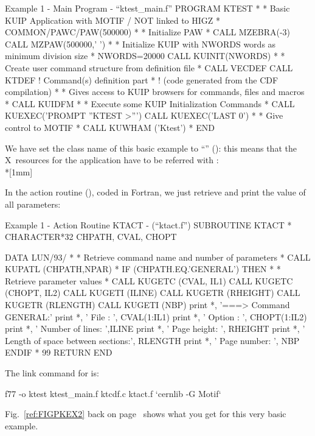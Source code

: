 \begin{XMPt} {Example 1 - Main Program - ``ktest\_main.f''}
      PROGRAM KTEST
*
* Basic KUIP Application with MOTIF / NOT linked to HIGZ
*
      COMMON/PAWC/PAW(500000)
*
* Initialize PAW
*
      CALL MZEBRA(-3)
      CALL MZPAW(500000,' ')
*
* Initialize KUIP with NWORDS words as minimum division size
*
      NWORDS=20000
      CALL KUINIT(NWORDS)
*
* Create user command structure from definition file
*
      CALL VECDEF
      CALL KTDEF          ! Command(s) definition part
*                         ! (code generated from the CDF compilation)
*
* Gives access to KUIP browsers for commands, files and macros
*
      CALL KUIDFM
*
* Execute some KUIP Initialization Commands
*
      CALL KUEXEC('PROMPT ''KTEST >''')
      CALL KUEXEC('LAST 0')
*
* Give control to MOTIF
*
      CALL KUWHAM ('Ktest')
*  
      END
\end{XMPt}

We have set the class name of this basic example to ``'' 
(): this means that the X~resources for the application 
have to be referred with :
\\*[1mm]\mbox{}

In the action routine (), coded in Fortran,  we just retrieve and
print the value of all parameters:

\begin{XMPt} {Example 1 - Action Routine KTACT - (``ktact.f'')}
      SUBROUTINE KTACT
*
      CHARACTER*32 CHPATH, CVAL, CHOPT

      DATA LUN/93/
*
* Retrieve command name and number of parameters
*
      CALL KUPATL (CHPATH,NPAR)
*
      IF (CHPATH.EQ.'GENERAL') THEN
*
* Retrieve parameter values
*
           CALL KUGETC (CVAL, IL1)
           CALL KUGETC (CHOPT, IL2)
           CALL KUGETI (ILINE)
           CALL KUGETR (RHEIGHT)
           CALL KUGETR (RLENGTH)
           CALL KUGETI (NBP)
           print *, '===> Command GENERAL:'
           print *, '     File : ', CVAL(1:IL1)
           print *, '     Option : ', CHOPT(1:IL2)
           print *, '     Number of lines: ',ILINE
           print *, '     Page height: ', RHEIGHT
           print *, '     Length of space between sections:', RLENGTH
           print *, '     Page number: ', NBP
      ENDIF
*
 99   RETURN
      END
\end{XMPt}

The link command for  is:
\begin{XMP}
f77 -o ktest ktest_main.f ktcdf.c ktact.f `cernlib -G Motif`
\end{XMP}
Fig.~\ref{ref:FIGPKEX2} back on page~\pageref{ref:FIGPKEX2} shows what you
get for this very basic example.

